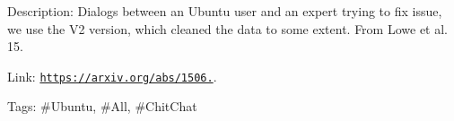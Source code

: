 Description\+: Dialogs between an Ubuntu user and an expert trying to fix issue, we use the V2 version, which cleaned the data to some extent. From Lowe et al. \textquotesingle{}15.

Link\+: \href{https://arxiv.org/abs/1506.08909}{\tt https\+://arxiv.\+org/abs/1506.}.

Tags\+: \#\+Ubuntu, \#\+All, \#\+Chit\+Chat 